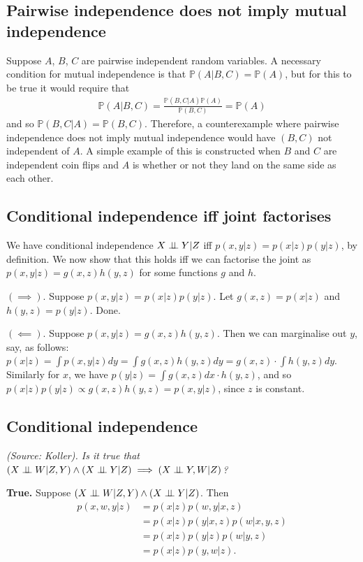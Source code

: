 \subsection{Pairwise independence does not imply mutual independence}
Suppose $A$, $B$, $C$ are pairwise independent random variables. A necessary condition for mutual independence is that $\mathbb{P}(A|B,C) = \mathbb{P}(A)$, but for this to be true it would require that
\begin{gather*}
\mathbb{P}(A|B,C) = \frac{\mathbb{P}(B,C|A)\mathbb{P}(A)}{\mathbb{P}(B,C)} = \mathbb{P}(A)
\end{gather*}
and so $\mathbb{P}(B,C|A) = \mathbb{P}(B,C)$. Therefore, a counterexample where pairwise independence does not imply mutual independence would have $(B,C)$ not independent of $A$. A simple example of this is constructed when $B$ and $C$ are independent coin flips and $A$ is whether or not they land on the same side as each other.

\subsection{Conditional independence iff joint factorises}
We have conditional independence $X \perp\!\!\!\perp Y | Z$ iff $p(x,y|z) = p(x|z)p(y|z)$, by definition. We now show that this holds iff we can factorise the joint as $p(x,y|z) = g(x,z)h(y,z)$ for some functions $g$ and $h$.

$(\implies).$ Suppose $p(x,y|z) = p(x|z)p(y|z)$. Let $g(x,z) = p(x|z)$ and $h(y,z) = p(y|z)$. Done.

$(\impliedby).$ Suppose $p(x,y|z) = g(x,z)h(y,z)$. Then we can marginalise out $y$, say, as follows: $p(x|z) = \int p(x,y|z) dy = \int g(x,z)h(y,z) dy = g(x,z) \cdot \int h(y,z) dy$. Similarly for $x$, we have $p(y|z) = \int g(x,z) dx \cdot h(y,z)$, and so $p(x|z)p(y|z) \propto g(x,z)h(y,z) = p(x,y|z)$, since $z$ is constant.

\subsection{Conditional independence}
\textit{(Source: Koller). Is it true that $(X \indep W | Z,Y) \land (X \indep Y | Z) \implies (X \indep Y, W | Z)$?}

\textbf{True.} Suppose $(X \perp\!\!\!\perp W|Z,Y) \land (X \perp\!\!\!\perp Y|Z)$. Then
\begin{align*}
p(x,w,y|z) &= p(x|z)p(w,y|x,z) \tag{chain rule}\\
&= p(x|z)p(y|x,z)p(w|x,y,z) \tag{chain rule}\\
&= p(x|z)p(y|z)p(w|y,z) \tag{assumption}\\
&= p(x|z)p(y,w|z). \tag*{\qed}
\end{align*}

